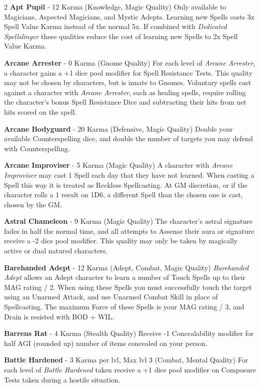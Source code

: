 \documentclass[
  oneside]{article}
\begin{document}
\begin{multicols}{2}
\textbf{Apt Pupil} - 12 Karma (Knowledge, Magic
Quality) Only available to Magicians, Aspected
Magicians, and Mystic Adepts. Learning new Spells
costs 3x Spell Value Karma instead of the normal
5x. If combined with \emph{Dedicated Spellslinger}
these qualities reduce the cost of learning new
Spells to 2x Spell Value Karma.

\textbf{Arcane Arrester} - 0 Karma (Gnome Quality)
For each level of \emph{Arcane Arrester}, a
character gains a +1 dice pool modifier for Spell
Resistance Tests. This quality may not be chosen
by characters, but is innate to Gnomes. Voluntary
spells cast against a character with \emph{Arcane
Arrester}, such as healing spells, require rolling
the character's bonus Spell Resistance Dice and
subtracting their hits from net hits scored on the
spell.

\textbf{Arcane Bodyguard} - 20 Karma (Defensive,
Magic Quality) Double your available
Counterspelling dice, and double the number of
targets you may defend with Counterspelling.

\textbf{Arcane Improviser} - 5 Karma (Magic
Quality) A character with \emph{Arcane Improviser}
may cast 1 Spell each day that they have not
learned. When casting a Spell this way it is
treated as Reckless Spellcasting. At GM
discretion, or if the character rolls a 1 result
on 1D6, a different Spell than the chosen one is
cast, chosen by the GM.

\textbf{Astral Chameleon} - 9 Karma (Magic
Quality) The character's astral signature fades in
half the normal time, and all attempts to Assense
their aura or signature receive a -2 dice pool
modifier. This quality may only be taken by
magically active or dual natured characters.

\textbf{Barehanded Adept} - 12 Karma (Adept,
Combat, Magic Quality) \emph{Barehanded Adept}
allows an Adept character to learn a number of
Touch Spells up to their MAG rating / 2. When
using these Spells you must successfully touch the
target using an Unarmed Attack, and use Unarmed
Combat Skill in place of Spellcasting. The maximum
Force of these Spells is your MAG rating / 3, and
Drain is resisted with BOD + WIL.

\textbf{Barrens Rat} - 4 Karma (Stealth Quality)
Receive -1 Concealability modifier for half AGI
(rounded up) number of items concealed on your
person.

\textbf{Battle Hardened} - 3 Karma per lvl, Max
lvl 3 (Combat, Mental Quality) For each level of
\emph{Battle Hardened} taken receive a +1 dice
pool modifier on Composure Tests taken during a
hostile situation.


\end{multicols}
\end{document}
